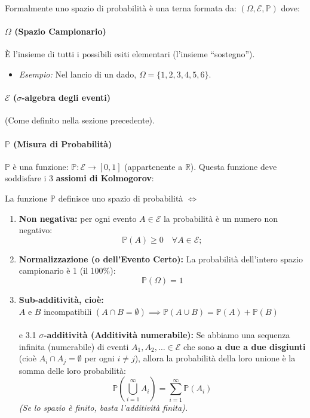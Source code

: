 Formalmente uno spazio di probabilità è una terna formata da: $(\Omega, \mathcal{E}, \mathbb{P})$
dove:

\paragraph{$\Omega$ (Spazio Campionario)}
È l'insieme di tutti i possibili esiti elementari (l'insieme ``sostegno'').
\begin{itemize}
    \item \textit{Esempio:} Nel lancio di un dado, $\Omega=\{1, 2, 3, 4, 5, 6\}$.
\end{itemize}

\paragraph{$\mathcal{E}$ ($\sigma$-algebra degli eventi)}
(Come definito nella sezione precedente).

\paragraph{$\mathbb{P}$ (Misura di Probabilità)}
$\mathbb{P}$ è una funzione: $\mathbb{P}: \mathcal{E} \to [0,1]$ (appartenente a $\mathbb{R}$).
Questa funzione deve soddisfare i 3 \textbf{assiomi di Kolmogorov}:

La funzione $\mathbb{P}$ definisce uno spazio di probabilità $\iff$

\begin{enumerate}
    \item \textbf{Non negativa:} per ogni evento $A \in \mathcal{E}$ la probabilità è un numero non negativo: 
    \[ \mathbb{P}(A) \ge 0 \quad \forall A \in \mathcal{E}; \]
    
    \item \textbf{Normalizzazione (o dell'Evento Certo):} La probabilità dell'intero spazio campionario è 1 (il 100\%):
    \[ \mathbb{P}(\Omega) = 1 \]
    \item \textbf{Sub-additività, cioè:} \\
    $A$ e $B$ incompatibili $(A \cap B = \emptyset) \implies \mathbb{P}(A \cup B) = \mathbb{P}(A) + \mathbb{P}(B)$
    \\\\e 3.1 \textbf{$\sigma$-additività (Additività numerabile):}
    Se abbiamo una sequenza infinita (numerabile) di eventi $A_1, A_2, \dots \in \mathcal{E}$ che sono \textbf{a due a due disgiunti} (cioè $A_i \cap A_j = \emptyset$ per ogni $i \neq j$), allora la probabilità della loro unione è la somma delle loro probabilità:
    \[ \mathbb{P}\left( \bigcup_{i=1}^{\infty} A_i \right) = \sum_{i=1}^{\infty} \mathbb{P}(A_i) \]
    \textit{(Se lo spazio è finito, basta l'additività finita).}
\end{enumerate}

